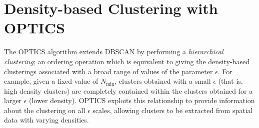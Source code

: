\section{Density-based Clustering with \acs{OPTICS}}
The \ac{OPTICS} algorithm\citep{Ankerst1999} extends \ac{DBSCAN} by performing a \emph{hierarchical clustering}; an ordering operation which is equivalent to giving the density-based clusterings associated with a broad range of values of the parameter $\epsilon$. For example, given a fixed value of $N_\mathrm{min}$, clusters obtained with a small $\epsilon$ (that is, high density clusters) are completely contained within the clusters obtained for a larger $\epsilon$ (lower density). \ac{OPTICS} exploits this relationship to provide information about the clustering on all $\epsilon$ scales, allowing clusters to be extracted from spatial data with varying densities.
